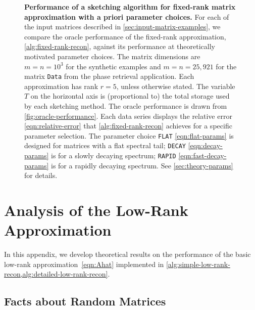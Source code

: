 \documentclass[final]{siamart1116}
\numberwithin{equation}{section}
\numberwithin{theorem}{section}
\numberwithin{figure}{section}
\begin{document}
\begin{figure}[htp!]
\caption{\textbf{Performance of a sketching algorithm for fixed-rank matrix approximation
with a priori parameter choices.}
For each of the input matrices described in \cref{sec:input-matrix-examples},
we compare the oracle performance of the fixed-rank approximation, \cref{alg:fixed-rank-recon},
against its performance at theoretically motivated parameter choices.
The matrix dimensions are $m = n = 10^3$ for the synthetic examples
and $m = n = 25,921$ for the matrix \texttt{Data}
from the phase retrieval application.  Each approximation has rank $r = 5$, unless otherwise stated.
The variable $T$ on the horizontal axis is (proportional to) the total storage used by each
sketching method.  The oracle performance is drawn from \cref{fig:oracle-performance}.
Each data series displays the relative error \cref{eqn:relative-error}
that \cref{alg:fixed-rank-recon} achieves for a specific parameter selection.
The parameter choice \texttt{FLAT} \cref{eqn:flat-params}
is designed for matrices with a flat spectral tail;  \texttt{DECAY} \cref{eqn:decay-params}
is for a slowly decaying spectrum; \texttt{RAPID} \cref{eqn:fast-decay-params}
is for a rapidly decaying spectrum. See \cref{sec:theory-params} for details.} \label{fig:theory-params}
\end{figure}





























\appendix

\section{Analysis of the Low-Rank Approximation}

In this appendix, we develop theoretical results on the performance
of the basic low-rank approximation~\cref{eqn:Ahat} implemented
in \cref{alg:simple-low-rank-recon,alg:detailed-low-rank-recon}.

\subsection{Facts about Random Matrices}
\end{document}
